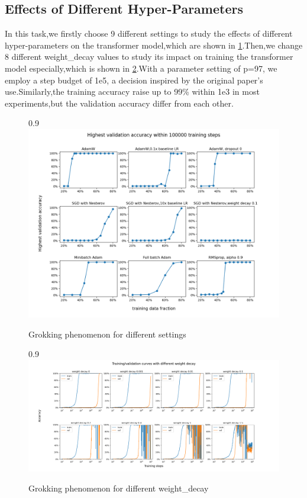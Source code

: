 \subsection{Effects of Different Hyper-Parameters}
\label{sec:subtask3}

In this task,we firstly choose 9 different settings to study the effects of different hyper-parameters on the transformer model,which are shown in \cref{fig:different_settings}.Then,we change 8 different weight_decay values to study its impact on training the transformer model especially,which is shown in \cref{fig:different weight_decay}.With a parameter setting of p=97, we employ a step budget of 1e5, a decision inspired by the original paper’s use.Similarly,the training accuracy raise up to 99\% within 1e3 in most experiments,but the validation accuracy differ from each other.

\begin{figure}[!ht]{0.9\textwidth}
    \centering
    \includegraphics[width=\linewidth]{fig/different_settings/different_settings.png}
    \caption{Grokking phenomenon for different settings}
    \label{fig:different_settings}
\end{figure}
\begin{figure}[!ht]{0.9\textwidth}
    \centering
    \includegraphics[width=\linewidth]{fig/weight_decay/weight_decay.png}
    \caption{Grokking phenomenon for different weight_decay}
    \label{fig:different weight_decay}
\end{figure}

